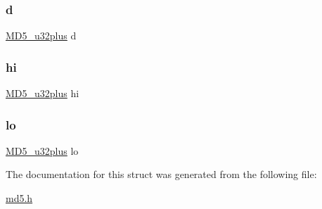\mbox{\label{struct_m_d5___c_t_x_a42be18d895cf7be9097073faf66734c1}} 
\subsubsection{\texorpdfstring{d}{d}}
{\footnotesize\ttfamily \mbox{\hyperlink{md5_8h_a7c9e2a59b92cd132f707337f6d940122}{M\+D5\+\_\+u32plus}} d}

\mbox{\label{struct_m_d5___c_t_x_ad674a11709e105451f48b99b9fe54792}} 
\subsubsection{\texorpdfstring{hi}{hi}}
{\footnotesize\ttfamily \mbox{\hyperlink{md5_8h_a7c9e2a59b92cd132f707337f6d940122}{M\+D5\+\_\+u32plus}} hi}

\mbox{\label{struct_m_d5___c_t_x_ab6f070d5d937f16cddb2d666c32fdb8e}} 
\subsubsection{\texorpdfstring{lo}{lo}}
{\footnotesize\ttfamily \mbox{\hyperlink{md5_8h_a7c9e2a59b92cd132f707337f6d940122}{M\+D5\+\_\+u32plus}} lo}



The documentation for this struct was generated from the following file\+:\begin{DoxyCompactItemize}
\item 
\mbox{\hyperlink{md5_8h}{md5.\+h}}\end{DoxyCompactItemize}
